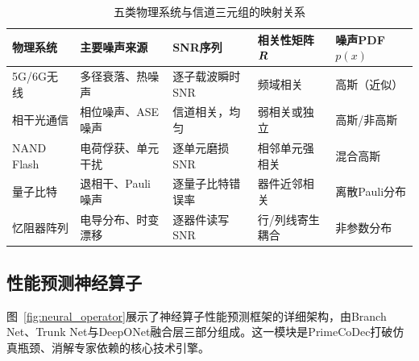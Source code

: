 \begin{table}[htbp]
\centering
\caption{五类物理系统与信道三元组的映射关系}
\label{tab:channel_mapping}
\setlength{\tabcolsep}{5pt}
\begin{tabular}{@{}L{2.2cm}L{3.0cm}L{2.8cm}L{2.8cm}L{2.4cm}@{}}
\toprule
\textbf{物理系统} & \textbf{主要噪声来源} & \textbf{SNR序列} & \textbf{相关性矩阵$\bm{R}$} & \textbf{噪声PDF $p(x)$} \\
\midrule
5G/6G无线 & 多径衰落、热噪声 & 逐子载波瞬时SNR & 频域相关 & 高斯（近似） \\
相干光通信 & 相位噪声、ASE噪声 & 信道相关，均匀 & 弱相关或独立 & 高斯/非高斯 \\
NAND Flash & 电荷俘获、单元干扰 & 逐单元磨损SNR & 相邻单元强相关 & 混合高斯 \\
量子比特 & 退相干、Pauli噪声 & 逐量子比特错误率 & 器件近邻相关 & 离散Pauli分布 \\
忆阻器阵列 & 电导分布、时变漂移 & 逐器件读写SNR & 行/列线寄生耦合 & 非参数分布 \\
\bottomrule
\end{tabular}
\end{table}

\subsection{性能预测神经算子}\label{sec:predictor}

图~\ref{fig:neural_operator}展示了神经算子性能预测框架的详细架构，由Branch Net、Trunk Net与DeepONet融合层三部分组成。这一模块是PrimeCoDec打破仿真瓶颈、消解专家依赖的核心技术引擎。

